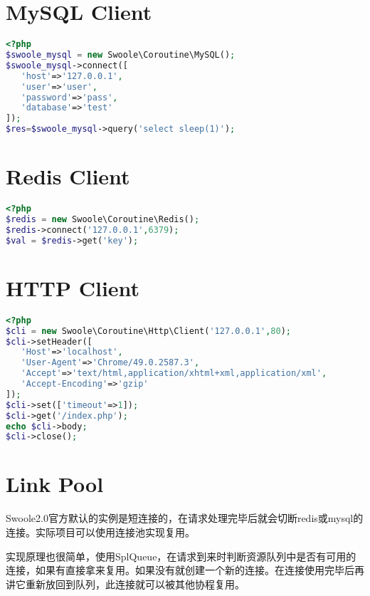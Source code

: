 \section{MySQL Client}



\begin{lstlisting}[language=PHP]
<?php
$swoole_mysql = new Swoole\Coroutine\MySQL();
$swoole_mysql->connect([
   'host'=>'127.0.0.1',
   'user'=>'user',
   'password'=>'pass',
   'database'=>'test'
]);
$res=$swoole_mysql->query('select sleep(1)');
\end{lstlisting}

\section{Redis Client}


\begin{lstlisting}[language=PHP]
<?php
$redis = new Swoole\Coroutine\Redis();
$redis->connect('127.0.0.1',6379);
$val = $redis->get('key');
\end{lstlisting}

\section{HTTP Client}


\begin{lstlisting}[language=PHP]
<?php
$cli = new Swoole\Coroutine\Http\Client('127.0.0.1',80);
$cli->setHeader([
   'Host'=>'localhost',
   'User-Agent'=>'Chrome/49.0.2587.3',
   'Accept'=>'text/html,application/xhtml+xml,application/xml',
   'Accept-Encoding'=>'gzip'
]);
$cli->set(['timeout'=>1]);
$cli->get('/index.php');
echo $cli->body;
$cli->close();
\end{lstlisting}



\section{Link Pool}

Swoole2.0官方默认的实例是短连接的，在请求处理完毕后就会切断redis或mysql的连接。实际项目可以使用连接池实现复用。

实现原理也很简单，使用SplQueue，在请求到来时判断资源队列中是否有可用的连接，如果有直接拿来复用。如果没有就创建一个新的连接。在连接使用完毕后再讲它重新放回到队列，此连接就可以被其他协程复用。



